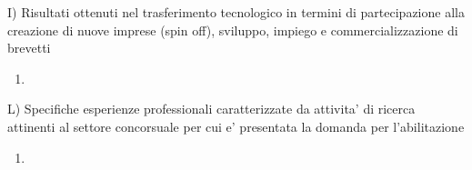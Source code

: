 \documentclass{resume} %
\begin{document}
\begin{rSectionLower}{I) Risultati ottenuti nel trasferimento tecnologico in termini di partecipazione alla creazione di nuove imprese (spin off), sviluppo, impiego e commercializzazione di brevetti}
	\begin{enumerate}
		\item 
	\end{enumerate}
\end{rSectionLower}

\begin{rSectionLower}{L) Specifiche esperienze professionali caratterizzate da attivita' di ricerca attinenti al settore concorsuale per cui e' presentata la domanda per l'abilitazione
}
	\begin{enumerate}
		\item 
	\end{enumerate}
\end{rSectionLower}
\end{document}
